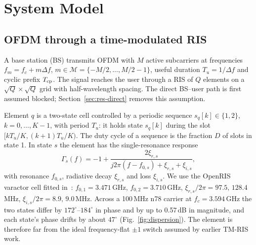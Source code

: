 \section{System Model}\label{sec:model}

\subsection{OFDM through a time-modulated RIS}
A base station (BS) transmits OFDM with $M$ active subcarriers at frequencies
$f_m=f_c+m\Delta f$, $m\in\mathcal M=\{-M/2,\dots,M/2-1\}$, useful duration
$T_u=1/\Delta f$ and cyclic prefix $T_{\rm cp}$. The signal reaches the user through a
RIS of $Q$ elements on a $\sqrt Q\times\sqrt Q$ grid with half-wavelength spacing. The
direct BS--user path is first assumed blocked; Section~\ref{sec:res-direct} removes this
assumption.

Element $q$ is a two-state cell controlled by a periodic sequence
$s_q[k]\in\{1,2\}$, $k=0,\dots,K-1$, with period $T_u$: it holds state $s_q[k]$ during
the slot $[kT_u/K,(k+1)T_u/K)$. The duty cycle of a sequence is the fraction $D$ of slots
in state 1. In state $s$ the element has the single-resonance response~\cite{iudice2026}
\begin{equation}
\Gamma_s(f)=-1+\frac{2\xi_{r,s}}{j2\pi(f-f_{0,s})+\xi_{r,s}+\xi_{i,s}},
\label{eq:gamma}
\end{equation}
with resonance $f_{0,s}$, radiative decay $\xi_{r,s}$ and loss $\xi_{i,s}$. We use the
OpenRIS varactor cell fitted in~\cite[Table~I]{iudice2026}: $f_{0,1}=3.471$\,GHz,
$f_{0,2}=3.710$\,GHz, $\xi_{r,s}/2\pi=97.5,\,128.4$\,MHz, $\xi_{i,s}/2\pi=8.9,\,9.0$\,MHz.
Across a 100\,MHz n78 carrier at $f_c=3.594$\,GHz the two states differ by
$172^\circ$--$184^\circ$ in phase and by up to 0.57\,dB in magnitude, and each state's
phase drifts by about $47^\circ$ (Fig.~\ref{fig:dispersion}). The element is therefore
far from the ideal frequency-flat $\pm1$ switch assumed by earlier TM-RIS work.

